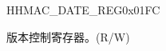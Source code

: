 \begin{register}{H}{HMAC\_DATE\_REG}{0x01FC}\label{regdesc:HMACDATEREG}
%
%
\regnewline%
\begin{regdesc}\begin{reglist}
\label{fielddesc:HMACDATE}\item [HMAC\_DATE] 版本控制寄存器。(R/W)
\end{reglist}\end{regdesc}
\end{register}
